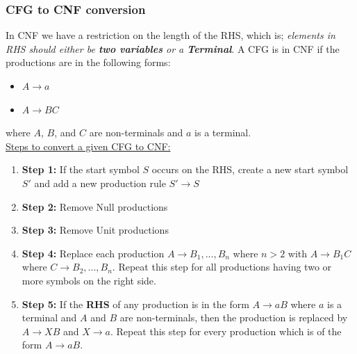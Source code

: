 \documentclass[20pt]{article} %
\begin{document}
\subsubsection{CFG to CNF conversion}
In CNF we have a restriction on the length of the RHS, which is; \textit{elements in RHS should either be \textbf{two variables} or a \textbf{Terminal}}.  A CFG is in CNF if the productions are in the following forms:
\begin{itemize}
\item $A \rightarrow a$
\item $A \rightarrow BC$
\end{itemize}
where $A$, $B$, and $C$ are non-terminals and $a$ is a terminal.\\
\underline{Steps to convert a given CFG to CNF:}
\begin{enumerate}
\item \textbf{Step 1:} If the start symbol $S$ occurs on the RHS, create a new start symbol $S'$ and add a new production rule $S' \rightarrow S$
\item \textbf{Step 2:} Remove Null productions
\item \textbf{Step 3:} Remove Unit productions
\item \textbf{Step 4:} Replace each production $A \rightarrow B_1, ... , B_n$ where $n > 2$ with $A \rightarrow B_1 C$ where $C \rightarrow B_2, ... , B_n$. Repeat this step for all productions having two or more symbols on the right side.
\item \textbf{Step 5:} If the \textbf{RHS} of any production is in the form $A \rightarrow aB$ where $a$ is a terminal and $A$ and $B$ are non-terminals, then the production is replaced by $A \rightarrow XB$ and $X \rightarrow a$.  Repeat this step for every production which is of the form $A \rightarrow aB$.
\end{enumerate}
\end{document}
